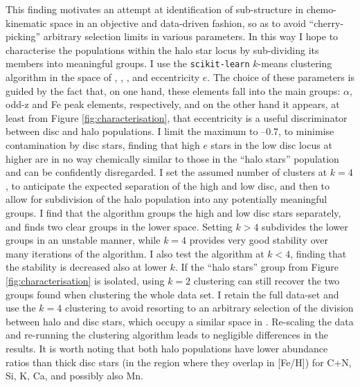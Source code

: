  This finding motivates an attempt at identification
of sub-structure in chemo-kinematic space in an objective and
data-driven fashion, so as to avoid ``cherry-picking'' arbitrary
selection limits in various parameters.  In this way I hope to
characterise the populations within the halo star locus by sub-dividing
its members into meaningful groups.  I use the \texttt{scikit-learn}
$k$-means clustering algorithm \citep{scikit-learn} in the space
of \feh{}, \mgfe{}, \alfe{}, \nife{} and eccentricity $e$.  The
choice of these parameters is guided by the fact that, on one hand,
these elements fall into the main groups: $\alpha$, odd-z and Fe
peak elements, respectively, and on the other hand it appears, at
least from Figure \ref{fig:characterisation}, that eccentricity is
a useful discriminator between disc and halo populations.  I limit
the maximum \feh{} to --0.7, to minimise contamination by disc
stars, finding that high $e$ stars in the low \afe{} disc locus at
higher \feh{} are in no way chemically similar to those in the ``halo
stars'' population and can be confidently disregarded. I set the
assumed number of clusters at $k= 4$, to anticipate the expected
separation of the high and low \afe{} disc, and then to allow for
subdivision of the halo population into any potentially meaningful
groups.  I find that the algorithm groups the high and low \afe{}
disc stars separately, and finds two clear groups in the lower
\feh{} space.  Setting $k>4$ subdivides the lower \feh{} groups in
an unstable manner, while $k=4$ provides very good stability over
many iterations of the algorithm. I also test the algorithm at $k
< 4$, finding that the stability is decreased also at lower $k$.
If the ``halo stars'' group from Figure \ref{fig:characterisation}
is isolated, using $k=2$ clustering can still recover the two groups
found when clustering the whole data set. I retain the full data-set
and use the $k=4$ clustering to avoid resorting to an arbitrary
selection of the division between halo and disc stars, which occupy a similar space in \feh{}. Re-scaling
the data and re-running the clustering algorithm leads to
negligible differences in the results. It is worth noting that
both halo populations have lower abundance ratios than thick disc
stars (in the region where they overlap in [Fe/H]) for C+N, Si, K,
Ca, and possibly also Mn.

